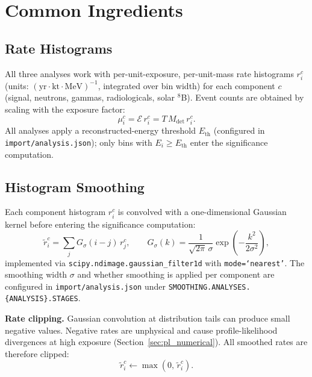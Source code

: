 \documentclass[12pt,a4paper]{article}
\begin{document}
\section{Common Ingredients}
\label{sec:common}

\subsection{Rate Histograms}
\label{sec:rates}

All three analyses work with per-unit-exposure, per-unit-mass rate histograms
$r_i^c$ (units: $(\mathrm{yr\cdot kt\cdot MeV})^{-1}$, integrated over bin width)
for each component $c$ (signal, neutrons, gammas, radiologicals, solar $^8$B).
Event counts are obtained by scaling with the exposure factor:
\begin{equation}
  \mu_i^c = \mathcal{E}\, r_i^c = T\,M_{\mathrm{det}}\, r_i^c.
  \label{eq:rate_to_counts}
\end{equation}
All analyses apply a reconstructed-energy threshold $E_{\mathrm{th}}$
(configured in \texttt{import/analysis.json}); only bins with $E_i \ge E_{\mathrm{th}}$
enter the significance computation.

\subsection{Histogram Smoothing}
\label{sec:smoothing}

Each component histogram $r_i^c$ is convolved with a one-dimensional Gaussian kernel
before entering the significance computation:
\begin{equation}
  \tilde{r}_{i}^{c} = \sum_{j} G_\sigma(i-j)\, r_j^{c},
  \qquad
  G_\sigma(k) = \frac{1}{\sqrt{2\pi}\,\sigma}
    \exp\!\left(-\frac{k^2}{2\sigma^2}\right),
  \label{eq:gaussian_smooth}
\end{equation}
implemented via \texttt{scipy.ndimage.gaussian\_filter1d} with
\texttt{mode=`nearest'}.  The smoothing width $\sigma$ and whether
smoothing is applied per component are configured in
\texttt{import/analysis.json} under \texttt{SMOOTHING.ANALYSES.\{ANALYSIS\}.STAGES}.

\medskip
\noindent\textbf{Rate clipping.}
Gaussian convolution at distribution tails can produce small negative values.
Negative rates are unphysical and cause profile-likelihood divergences
at high exposure (Section~\ref{sec:pl_numerical}).
All smoothed rates are therefore clipped:
\begin{equation}
  \tilde{r}_{i}^{c} \leftarrow \max\!\left(0,\,\tilde{r}_{i}^{c}\right).
  \label{eq:clip}
\end{equation}
\end{document}

